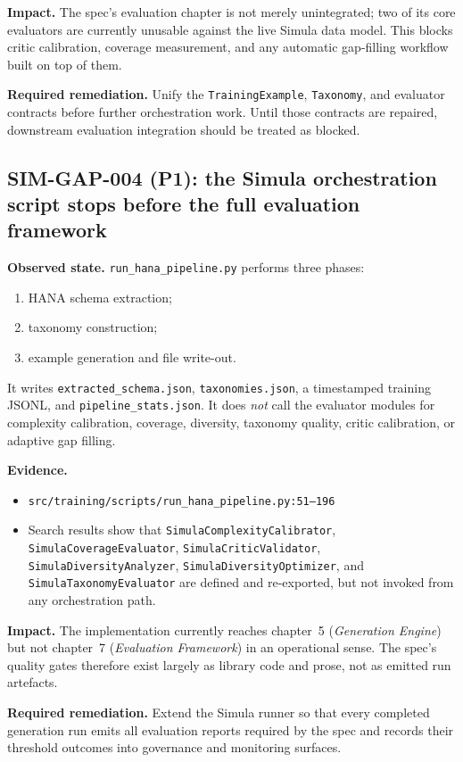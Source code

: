 \documentclass[12pt,a4paper,twoside]{report}
\begin{document}
\textbf{Impact.}
The spec's evaluation chapter is not merely unintegrated; two of its
core evaluators are currently unusable against the live Simula data
model. This blocks critic calibration, coverage measurement, and any
automatic gap-filling workflow built on top of them.

\textbf{Required remediation.}
Unify the \texttt{TrainingExample}, \texttt{Taxonomy}, and evaluator
contracts before further orchestration work. Until those contracts
are repaired, downstream evaluation integration should be treated as
blocked.

\subsection*{SIM-GAP-004 (P1): the Simula orchestration script stops before the full evaluation framework}
\textbf{Observed state.}
\texttt{run\_hana\_pipeline.py} performs three phases:
\begin{enumerate}[label=\arabic*.]
\item HANA schema extraction;
\item taxonomy construction;
\item example generation and file write-out.
\end{enumerate}
It writes \texttt{extracted\_schema.json},
\texttt{taxonomies.json}, a timestamped training JSONL, and
\texttt{pipeline\_stats.json}. It does \emph{not} call the evaluator
modules for complexity calibration, coverage, diversity, taxonomy
quality, critic calibration, or adaptive gap filling.

\textbf{Evidence.}
\begin{itemize}
\item \texttt{src/training/scripts/run\_hana\_pipeline.py:51--196}
\item Search results show that
\texttt{SimulaComplexityCalibrator},
\texttt{SimulaCoverageEvaluator},
\texttt{SimulaCriticValidator},
\texttt{SimulaDiversityAnalyzer},
\texttt{SimulaDiversityOptimizer}, and
\texttt{SimulaTaxonomyEvaluator} are defined and re-exported, but
not invoked from any orchestration path.
\end{itemize}

\textbf{Impact.}
The implementation currently reaches chapter~5
(\emph{Generation Engine}) but not chapter~7
(\emph{Evaluation Framework}) in an operational sense. The spec's
quality gates therefore exist largely as library code and prose, not
as emitted run artefacts.

\textbf{Required remediation.}
Extend the Simula runner so that every completed generation run emits
all evaluation reports required by the spec and records their
threshold outcomes into governance and monitoring surfaces.
\end{document}
